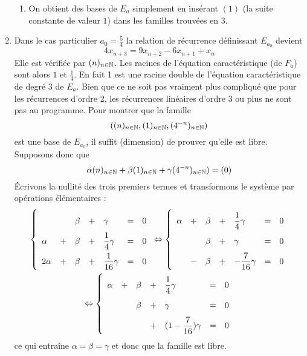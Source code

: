 \begin{enumerate}
\begin{enumerate}
\item On obtient des bases de $E_a$ simplement en insérant $(1)$ (la suite constante de valeur $1$) dans les familles trouvées en 3.
\end{enumerate}
\item Dans le cas particulier $a_0=\frac{5}{4}$ la relation de récurrence définissant $E_{a_0}$ devient 
\begin{displaymath}
 4x_{n+3}=9x_{n+2}-6x_{n+1}+x_n
\end{displaymath}
Elle est vérifiée par $(n)_{n\in\mathbb{N}}$. Les racines de l'équation caractéristique (de $F_a$) sont alors $1$ et $\frac{1}{4}$. En fait 1 est une racine double de l'équation caractéristique de degré 3 de $E_a$. Bien que ce ne soit pas vraiment plus compliqué que pour les récurrences d'ordre 2, les récurrences linéaires d'ordre 3 ou plus ne sont pas au programme.
Pour montrer que la famille
\begin{displaymath}
 ((n)_{n\in\mathbb{N}},(1)_{n\in\mathbb{N}},(4^{-n})_{n\in\mathbb{N}})
\end{displaymath}
est une base de $E_{a_0}$, il suffit (dimension) de prouver qu'elle est libre. Supposons donc que
\begin{displaymath}
 \alpha(n)_{n\in\mathbb{N}} +\beta(1)_{n\in\mathbb{N}}+\gamma(4^{-n})_{n\in\mathbb{N}})=(0)
\end{displaymath}
\'Ecrivons la nullité des trois premiers termes et transformons le système par opérations élémentaires :
\begin{multline*}
\renewcommand{\arraystretch}{2}
\left\lbrace \begin{array}{lclclcl}
& & \beta &+& \gamma & = & 0\\ 
\alpha &+&\beta &+& \dfrac{1}{4}\gamma &= & 0 \\ 
2\alpha &+&\beta &+& \dfrac{1}{16}\gamma &= &0
\end{array}\right. 
\Leftrightarrow
\left\lbrace \begin{array}{lclclcl}
\alpha &+&\beta &+& \dfrac{1}{4}\gamma &= & 0 \\ 
& & \beta &+& \gamma & = & 0\\ 
 & -&\beta  &+& -\dfrac{7}{16}\gamma &= &0
\end{array}\right. 
\\ \Leftrightarrow
\left\lbrace \begin{array}{lclclcl}
\alpha &+&\beta &+& \dfrac{1}{4}\gamma &= & 0 \\ 
& & \beta &+& \gamma & = & 0\\ 
 & &  &+& (1-\dfrac{7}{16})\gamma &= &0
\end{array}\right. 
\end{multline*}
ce qui entraîne $\alpha = \beta = \gamma$ et donc que la famille est libre.


\end{enumerate}
